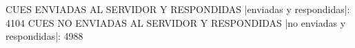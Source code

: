 CUES ENVIADAS AL SERVIDOR Y RESPONDIDAS
|enviadas y respondidas|: 4104
CUES NO ENVIADAS AL SERVIDOR Y RESPONDIDAS
|no enviadas y respondidas|: 4988